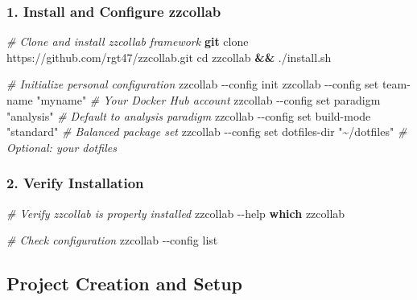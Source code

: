 \documentclass[
]{article}
\newenvironment{Shaded}{\begin{snugshade}}{\end{snugshade}}
\newcommand{\AttributeTok}[1]{\textcolor[rgb]{0.13,0.29,0.53}{#1}}
\newcommand{\BuiltInTok}[1]{#1}
\newcommand{\CommentTok}[1]{\textcolor[rgb]{0.56,0.35,0.01}{\textit{#1}}}
\newcommand{\ExtensionTok}[1]{#1}
\newcommand{\FunctionTok}[1]{\textcolor[rgb]{0.13,0.29,0.53}{\textbf{#1}}}
\newcommand{\KeywordTok}[1]{\textcolor[rgb]{0.13,0.29,0.53}{\textbf{#1}}}
\newcommand{\NormalTok}[1]{#1}
\newcommand{\StringTok}[1]{\textcolor[rgb]{0.31,0.60,0.02}{#1}}
\begin{document}
\subsubsection{1. Install and Configure
zzcollab}\label{install-and-configure-zzcollab}

\begin{Shaded}
\begin{Highlighting}[]
\CommentTok{\# Clone and install zzcollab framework}
\FunctionTok{git}\NormalTok{ clone https://github.com/rgt47/zzcollab.git}
\BuiltInTok{cd}\NormalTok{ zzcollab }\KeywordTok{\&\&} \ExtensionTok{./install.sh}

\CommentTok{\# Initialize personal configuration}
\ExtensionTok{zzcollab} \AttributeTok{{-}{-}config}\NormalTok{ init}
\ExtensionTok{zzcollab} \AttributeTok{{-}{-}config}\NormalTok{ set team{-}name }\StringTok{"myname"}        \CommentTok{\# Your Docker Hub account}
\ExtensionTok{zzcollab} \AttributeTok{{-}{-}config}\NormalTok{ set paradigm }\StringTok{"analysis"}       \CommentTok{\# Default to analysis paradigm}
\ExtensionTok{zzcollab} \AttributeTok{{-}{-}config}\NormalTok{ set build{-}mode }\StringTok{"standard"}     \CommentTok{\# Balanced package set}
\ExtensionTok{zzcollab} \AttributeTok{{-}{-}config}\NormalTok{ set dotfiles{-}dir }\StringTok{"\textasciitilde{}/dotfiles"} \CommentTok{\# Optional: your dotfiles}
\end{Highlighting}
\end{Shaded}

\subsubsection{2. Verify Installation}\label{verify-installation}

\begin{Shaded}
\begin{Highlighting}[]
\CommentTok{\# Verify zzcollab is properly installed}
\ExtensionTok{zzcollab} \AttributeTok{{-}{-}help}
\FunctionTok{which}\NormalTok{ zzcollab}

\CommentTok{\# Check configuration}
\ExtensionTok{zzcollab} \AttributeTok{{-}{-}config}\NormalTok{ list}
\end{Highlighting}
\end{Shaded}

\subsection{Project Creation and
Setup}\label{project-creation-and-setup}
\end{document}
